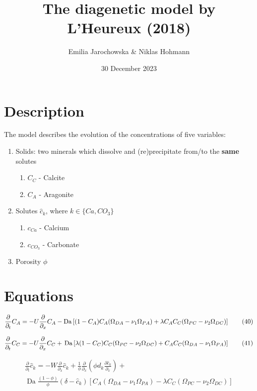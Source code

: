 \documentclass[10pt, letterpaper]{article}
\title{The diagenetic model by L'Heureux (2018)}
\author{Emilia Jarochowska & Niklas Hohmann}
\date{30 December 2023}
\begin{document}
\maketitle

\section{Description}
The model describes the evolution of the concentrations of five variables:
\begin{enumerate}
    \item Solids: two minerals which dissolve and (re)precipitate from/to the \textbf{same} solutes 
    \begin{enumerate}
        \item $C_C$ - Calcite
        \item $C_A$ - Aragonite
    \end{enumerate}
    \item Solutes $\hat{c}_k$, where $k \in \{Ca, CO_{3}\}$
    \begin{enumerate}
        \item $c_{Ca}$ - Calcium 
        \item $c_{CO_{3}}$ - Carbonate 
    \end{enumerate}
    \item Porosity $\phi$
\end{enumerate}

\section{Equations}
\begin{equation}
\frac{\partial}{\partial_t} C_A = -U\frac{\partial}{\partial_x} C_A - \operatorname{Da}\left[(1 - C_A)C_A (\Omega_{DA} - \nu_1 \Omega_{PA}) \\
        + \lambda C_A C_C (\Omega_{PC} - \nu_2 \Omega_{DC})\right] \tag{40}
\end{equation}

\begin{equation}
\frac{\partial}{\partial_t} C_C = -U\frac{\partial}{\partial_x} C_C + \\\operatorname{Da}\left[\lambda(1-C_C)C_C(\Omega_{PC} - \nu_2 \Omega_{DC}) + C_A C_C (\Omega_{DA} - \nu_1 \Omega_{PA})\right] \tag{41}
\end{equation}

\begin{equation}
\begin{align*}
   \frac{\partial}{\partial_t} \hat{c}_k = -W \frac{\partial}{\partial_x} \hat{c}_k + \frac{1}{\phi} \frac{\partial}{\partial_x} \left(\phi d_k \frac{\partial\hat{c}_k}{\partial_x}\right )+ \\
   \operatorname{Da} \frac{(1 - \phi)}{\phi} (\delta - \hat{c}_k) \left[C_A (\Omega_{DA} - \nu_1 \Omega_{PA}) - \lambda C_C (\Omega_{PC} - \nu_2 \Omega_{DC})\right] \tag{42}
\end{align*}
\end{equation}
\end{document}
